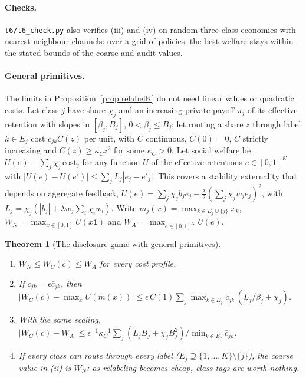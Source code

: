 \documentclass[12pt]{article}
\newtheorem{theorem}{Theorem}[section]
\theoremstyle{definition}
\theoremstyle{remark}
\begin{document}
\paragraph{Checks.} \nolinkurl{t6/t6_check.py} also verifies (iii) and (iv) on random three-class economies with nearest-neighbour channels: over a grid of policies, the best welfare stays within the stated bounds of the coarse and audit values.

\paragraph{General primitives.} The limits in Proposition~\ref{prop:relabelK} do not need linear values or quadratic costs. Let class $j$ have share $\chi_j$ and an increasing private payoff $\pi_j$ of its effective retention with slopes in $[\beta_j,B_j]$, $0<\beta_j\le B_j$; let routing a share $z$ through label $k\in E_j$ cost $c_{jk}C(z)$ per unit, with $C$ continuous, $C(0)=0$, $C$ strictly increasing and $C(z)\ge\kappa_Cz^2$ for some $\kappa_C>0$. Let social welfare be $U(e)-\sum_j\chi_j\,\mathrm{cost}_j$ for any function $U$ of the effective retentions $e\in[0,1]^K$ with $|U(e)-U(e')|\le\sum_jL_j|e_j-e'_j|$. This covers a stability externality that depends on aggregate feedback, $U(e)=\sum_j\chi_jb_je_j-\tfrac\lambda2(\sum_j\chi_jw_je_j)^2$, with $L_j=\chi_j(|b_j|+\lambda w_j\sum_i\chi_iw_i)$. Write $m_j(x)=\max_{k\in E_j\cup\{j\}}x_k$, $W_N=\max_{x\in[0,1]}U(x\mathbf 1)$ and $W_A=\max_{e\in[0,1]^K}U(e)$.

\begin{theorem}[The disclosure game with general primitives]\label{thm:relabelgeneral}
\begin{enumerate}[label=(\roman*),itemsep=1pt]
\item $W_N\le W_C(c)\le W_A$ for every cost profile.
\item If $c_{jk}=\epsilon\bar c_{jk}$, then $\big|W_C(c)-\max_xU(m(x))\big|\le\epsilon\,C(1)\sum_j\max_{k\in E_j}\bar c_{jk}\,(L_j/\beta_j+\chi_j)$.
\item With the same scaling, $|W_C(c)-W_A|\le\epsilon^{-1}\kappa_C^{-1}\sum_j(L_jB_j+\chi_jB_j^2)/\min_{k\in E_j}\bar c_{jk}$.
\item If every class can route through every label ($E_j\supseteq\{1,\ldots,K\}\setminus\{j\}$), the coarse value in (ii) is $W_N$: as relabeling becomes cheap, class tags are worth nothing.
\end{enumerate}
\end{theorem}
\end{document}
